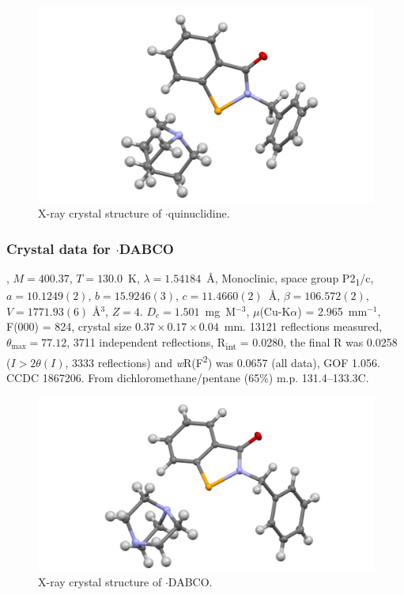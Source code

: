 \begin{refsection}
    \begin{figure}
      \includegraphics[width=0.6\linewidth]{Figures/ebs-bn-quin-xtal.pdf}
      \caption{X-ray crystal structure of \texorpdfstring{$ \cdot $quinuclidine}{C21H24N2OSe}.}
    \end{figure}
    
    \subsubsection{Crystal data for \texorpdfstring{$ \cdot $DABCO}{C20H23N3OSe}}
    , $M=400.37$, $T=130.0$~K, $\lambda=1.54184$~\AA, Monoclinic, space group P2\textsubscript{1}/c, $a = 10.1249(2)$, $b = 15.9246(3)$, $c = 11.4660(2)$~\AA, $\beta = 106.572(2)$\degree, $V = 1771.93(6)$ \AA$^{3}$, $Z = 4$.
    $D_{c} = 1.501$~mg~M$^{-3}$, $\mu$(Cu-K$\alpha$) = 2.965~mm$^{-1}$, F(000) = 824, crystal size $0.37 \times 0.17 \times 0.04$~mm.
    13121 reflections measured, $\theta_{\max} = 77.12$\degree, 3711 independent reflections, R\textsubscript{int} = 0.0280, the final R was 0.0258 ($I > 2\theta(I)$, 3333 reflections) and \textit{w}R(F\textsuperscript{2}) was 0.0657 (all data), GOF 1.056.
    CCDC 1867206.
    From dichloromethane/pentane (65\%) m.p. 131.4--133.3\degree{}C.
    
    \begin{figure}
      \includegraphics[width=0.6\linewidth]{Figures/ebs-bn-dabco-xtal.pdf}
      \caption{X-ray crystal structure of \texorpdfstring{$ \cdot $DABCO}{C20H23N3OSe}.}
    \end{figure}
    

\end{refsection}
